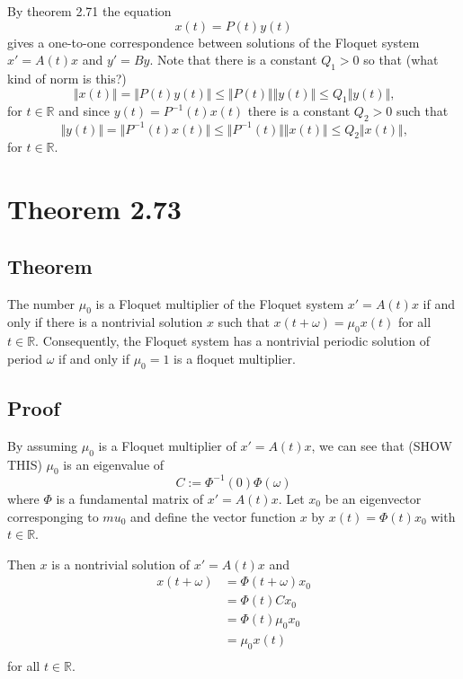 \documentclass[a4paper]{article}
\begin{document}
By theorem 2.71 the equation 
\begin{equation*}
    x(t) = P(t)y(t)
\end{equation*}
gives a one-to-one correspondence between solutions of the Floquet system $x' = A(t)x$ and $y' = By$. Note that there is a constant $Q_1 > 0$ so that (what kind of norm is this?) 
\begin{equation*}
    \Vert x(t) \Vert = \Vert P(t)y(t) \Vert \leq \Vert P(t) \Vert \Vert y(t) \Vert  \leq Q_{1} \Vert y(t) \Vert \text{,}
\end{equation*}
for $t \in \mathbb{R}$ and since $y(t) = P^{-1}(t)x(t)$ there is a constant $Q_2 > 0$ such that 
\begin{equation*}
    \Vert y(t) \Vert = \Vert P^{-1}(t)x(t) \Vert \leq \Vert P^{-1}(t) \Vert \Vert x(t) \Vert  \leq Q_{2} \Vert x(t) \Vert \text{,}
\end{equation*}
for $t \in \mathbb{R}$.

\section{Theorem 2.73}

\subsection{Theorem}

The number $\mu_0$ is a Floquet multiplier of the Floquet system $x' = A(t)x$ if and only if there is a nontrivial solution $x$ such that $x(t + \omega) = \mu_0 x(t)$ for all $t \in \mathbb{R}$. Consequently, the Floquet system has a nontrivial periodic solution of period $\omega$ if and only if $\mu_0 = 1$ is a floquet multiplier.

\subsection{Proof}

By assuming $\mu_0$ is a Floquet multiplier of $x' = A(t)x$, we can see that (SHOW THIS) $\mu_0$ is an eigenvalue of 
\begin{equation*}
    C := \Phi^{-1}(0)\Phi(\omega)
\end{equation*}
where $\Phi$ is a fundamental matrix of $x' = A(t)x$. Let $x_0$ be an eigenvector corresponging to $mu_0$ and define the vector function $x$ by $x(t) = \Phi(t)x_0$ with $t \in \mathbb{R}$.

Then $x$ is a nontrivial solution of $x' = A(t)x$ and \begin{equation*}
\begin{split}
    x(t + \omega) &= \Phi(t + \omega) x_0 \\
                  &= \Phi(t) C x_0\\
                  &= \Phi(t) \mu_0 x_0 \\
                  &= \mu_0 x(t) \\
\end{split}
\end{equation*}
for all $t \in \mathbb{R}$.
\end{document}
